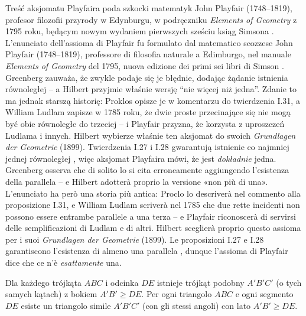 Treść aksjomatu Playfaira poda szkocki matematyk John Playfair (1748--1819), profesor filozofii przyrody w Edynburgu, w podręczniku \emph{Elements of Geometry} z 1795 roku, będącym nowym wydaniem pierwszych sześciu ksiąg Simsona \cite[s. 300]{hartshorne_2000}. %
L'enunciato dell'assioma di Playfair fu formulato dal matematico scozzese John Playfair (1748--1819), professore di filosofia naturale a Edimburgo, nel manuale \emph{Elements of Geometry} del 1795, nuova edizione dei primi sei libri di Simson \cite[p. 300]{hartshorne_2000}. %
%
Greenberg \cite[s. 201]{greenberg_2010} zauważa, że zwykle podaje się je błędnie, dodając żądanie istnienia równoległej -- a Hilbert przyjmie właśnie wersję ``nie więcej niż jedna''. %
Zdanie to ma jednak starszą historię: Proklos opisze je w komentarzu do twierdzenia I.31, a William Ludlam zapisze w 1785 roku, że dwie proste przecinające się nie mogą być obie równoległe do trzeciej -- i Playfair przyzna, że korzysta z uproszczeń Ludlama i innych. %
Hilbert wybierze właśnie ten aksjomat do swoich \emph{Grundlagen der Geometrie} (1899). %
Twierdzenia I.27 i I.28 gwarantują istnienie co najmniej jednej równoległej \cite[s. 284]{eves1_1972}, więc aksjomat Playfaira mówi, że jest \emph{dokładnie} jedna. %
Greenberg \cite[p. 201]{greenberg_2010} osserva che di solito lo si cita erroneamente aggiungendo l'esistenza della parallela -- e Hilbert adotterà proprio la versione «non più di una». %
L'enunciato ha però una storia più antica: Proclo lo descriverà nel commento alla proposizione I.31, e William Ludlam scriverà nel 1785 che due rette incidenti non possono essere entrambe parallele a una terza -- e Playfair riconoscerà di servirsi delle semplificazioni di Ludlam e di altri. %
Hilbert sceglierà proprio questo assioma per i suoi \emph{Grundlagen der Geometrie} (1899). %
Le proposizioni I.27 e I.28 garantiscono l'esistenza di almeno una parallela \cite[p. 284]{eves1_1972}, dunque l'assioma di Playfair dice che ce n'è \emph{esattamente} una. %
%

\begin{proposition}
[aksjomat Wallisa] %
[assioma di Wallis] %
	Dla każdego trójkąta $ABC$ i odcinka $DE$ istnieje trójkąt podobny $A'B'C'$ (o tych samych kątach) z bokiem $A'B' \ge DE$. %
	Per ogni triangolo $ABC$ e ogni segmento $DE$ esiste un triangolo simile $A'B'C'$ (con gli stessi angoli) con lato $A'B' \ge DE$. %
%
\end{proposition}

